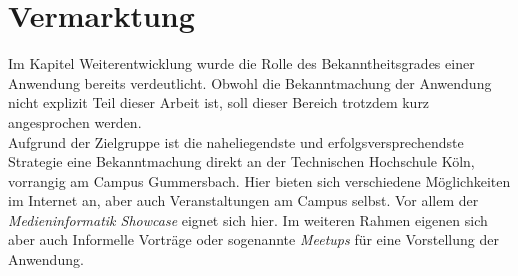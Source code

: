 \section{Vermarktung}
Im Kapitel Weiterentwicklung wurde die Rolle des Bekanntheitsgrades einer Anwendung bereits verdeutlicht. Obwohl die Bekanntmachung der Anwendung nicht explizit Teil dieser Arbeit ist, soll dieser Bereich trotzdem kurz angesprochen werden.\\
Aufgrund der Zielgruppe ist die naheliegendste und erfolgsversprechendste Strategie eine Bekanntmachung direkt an der Technischen Hochschule Köln, vorrangig am Campus Gummersbach. Hier bieten sich verschiedene Möglichkeiten im Internet an, aber auch Veranstaltungen am Campus selbst. Vor allem der \textit{Medieninformatik Showcase} eignet sich hier.
Im weiteren Rahmen eigenen sich aber auch Informelle Vorträge oder sogenannte \textit{Meetups} für eine Vorstellung der Anwendung.
